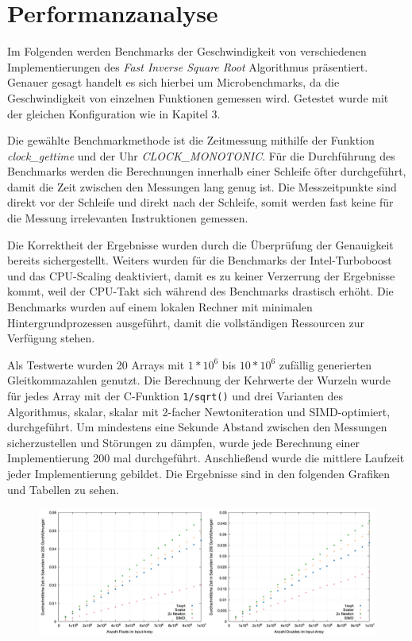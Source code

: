 \documentclass[course=erap]{aspdoc}
\begin{document}
\section{Performanzanalyse}
Im Folgenden werden Benchmarks der Geschwindigkeit von verschiedenen Implementierungen des \emph{Fast Inverse Square Root} Algorithmus präsentiert. Genauer gesagt handelt es sich hierbei um Microbenchmarks, da die Geschwindigkeit von einzelnen Funktionen gemessen wird. Getestet wurde mit der gleichen Konfiguration wie in Kapitel 3.\par
Die gewählte Benchmarkmethode ist die Zeitmessung mithilfe der Funktion \emph{clock\_gettime} und der Uhr \emph{CLOCK\_MONOTONIC}. Für die Durchführung des Benchmarks werden die Berechnungen innerhalb einer Schleife öfter durchgeführt, damit die Zeit zwischen den Messungen lang genug ist. Die Messzeitpunkte sind direkt vor der Schleife und direkt nach der Schleife, somit werden fast keine für die Messung irrelevanten Instruktionen gemessen. \par
Die Korrektheit der Ergebnisse wurden durch die Überprüfung der Genauigkeit bereits sichergestellt. Weiters wurden für die Benchmarks der Intel-Turboboost und das CPU-Scaling deaktiviert, damit es zu keiner Verzerrung der Ergebnisse kommt, weil der CPU-Takt sich während des Benchmarks drastisch erhöht. Die Benchmarks wurden auf einem lokalen Rechner mit minimalen Hintergrundprozessen ausgeführt, damit die vollständigen Ressourcen zur Verfügung stehen. \par
Als Testwerte wurden 20 Arrays mit $1*10^6$ bis $10*10^6$ zufällig generierten Gleitkommazahlen genutzt. Die Berechnung der Kehrwerte der Wurzeln wurde für jedes Array mit der  C-Funktion \lstinline{1/sqrt()} und drei Varianten des Algorithmus, skalar, skalar mit 2-facher Newtoniteration und SIMD-optimiert, durchgeführt. Um mindestens eine Sekunde Abstand zwischen den Messungen sicherzustellen und Störungen zu dämpfen, wurde jede Berechnung einer Implementierung 200 mal durchgeführt. Anschließend wurde die mittlere Laufzeit jeder Implementierung gebildet. Die Ergebnisse sind in den folgenden Grafiken und Tabellen zu sehen.
\begin{figure}[H]
\centering
  \includegraphics[width=1.0\linewidth]{images/plot_speed.png}
  \label{fig:runtime}
\end{figure}
\end{document}
